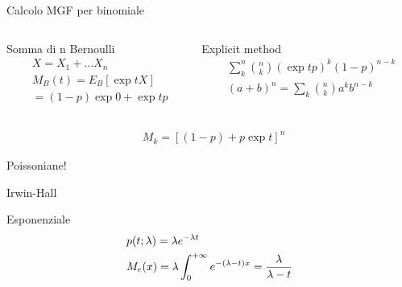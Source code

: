 \begin{wordonframe}{Calcolo MGF per binomiale}
\begin{columns}[T]
\begin{column}{0.5\textwidth}
\begin{block}{Somma di n Bernoulli}
\begin{align*}
&X=X_1+\ldots X_n\\
&M_B(t)=E_B[\exp{tX}]\\
&=(1-p)\exp{0}+\exp{t}p
\end{align*}
\end{block}
\end{column}
\begin{column}{0.5\textwidth}
\begin{block}{Explicit method}
\begin{align*}
&\sum_k^n\binom{n}{k}(\exp{t}p)^k(1-p)^{n-k}\\
&(a+b)^n=\sum_k\binom{n}{k}a^kb^{n-k}
\end{align*}
\end{block}
\end{column}
\end{columns}
\begin{align*}
&M_k=[(1-p)+p\exp{t}]^n
\end{align*}
\end{wordonframe}

\begin{wordonframe}{Poissoniane!}

\end{wordonframe}

\begin{frame}{Irwin-Hall}
    
\end{frame}

\begin{frame}{Esponenziale}
\begin{align*}
&p(t;\lambda)=\lambda e^{-\lambda t}\\
&M_e(x)=\lambda\int_{0}^{+\infty}{}e^{-(\lambda-t)x}=\frac{\lambda}{\lambda-t}
\end{align*}
\end{frame}